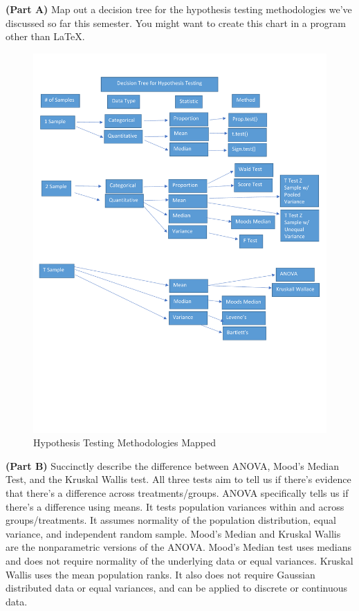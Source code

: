 \documentclass{article}
\begin{document}
\begin{enumerate}
\textbf{(Part A)} Map out a decision tree for the hypothesis testing methodologies
we've discussed so far this semester. You might want to create this chart in
a program other than \LaTeX.
\newline
\begin{figure}[h]
   \includegraphics[totalheight=8cm]{boat.jpg}
   \caption{Hypothesis Testing Methodologies Mapped}
   \label{fig:boat1}
 \end{figure}

\textbf{(Part B)} Succinctly describe the difference between ANOVA, Mood's Median
Test, and the Kruskal Wallis test.
\newline
All three tests aim to tell us if there's evidence that there's a difference across treatments/groups. ANOVA specifically tells us if there's a difference using means. It tests population variances within and across groups/treatments. It assumes normality of the population distribution, equal variance, and independent random sample. Mood's Median and Kruskal Wallis are the nonparametric versions of the ANOVA. Mood's Median test uses medians and does not require normality of the underlying data or equal variances. Kruskal Wallis uses the mean population ranks. It also does not require Gaussian distributed data or equal variances, and can be applied to discrete or continuous data. 


\end{enumerate}
\end{document}
